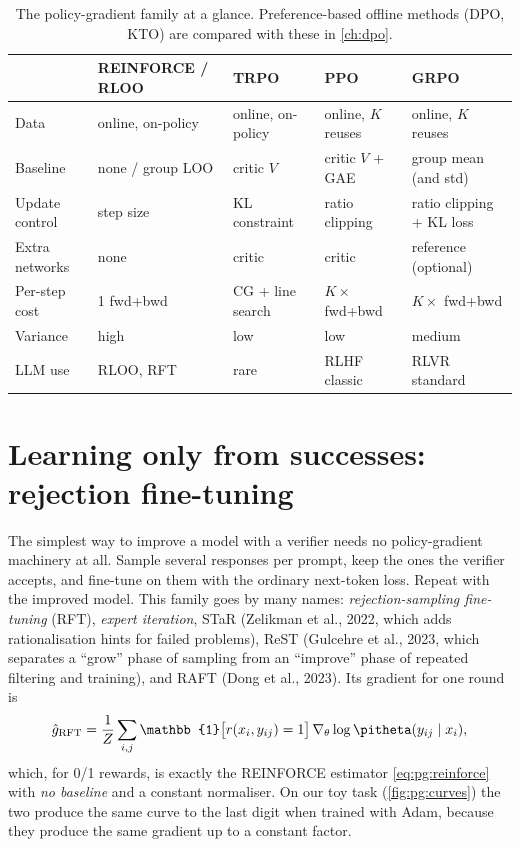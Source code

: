 \begin{table}[ht]
\centering\small
\begin{tabularx}{\linewidth}{@{}lXXXX@{}}
\toprule
& REINFORCE / RLOO & TRPO & PPO & GRPO\\
\midrule
Data & online, on-policy & online, on-policy & online, $K$ reuses & online, $K$ reuses\\
Baseline & none / group LOO & critic $V$ & critic $V$ + GAE & group mean (and std)\\
Update control & step size & KL constraint & ratio clipping & ratio clipping + KL loss\\
Extra networks & none & critic & critic & reference (optional)\\
Per-step cost & 1 fwd+bwd & CG + line search & $K\times$ fwd+bwd & $K\times$ fwd+bwd\\
Variance & high & low & low & medium\\
LLM use & RLOO, RFT & rare & RLHF classic & RLVR standard\\
\bottomrule
\end{tabularx}
\caption{The policy-gradient family at a glance. Preference-based offline methods (DPO, KTO)
are compared with these in \cref{ch:dpo}.}
\label{tab:pg:compare}
\end{table}
\section{Learning only from successes: rejection fine-tuning}\label{sec:pg:rft}

The simplest way to improve a model with a verifier needs no policy-gradient machinery at all.
Sample several responses per prompt, keep the ones the verifier accepts, and fine-tune on them
with the ordinary next-token loss. Repeat with the improved model. This family goes by many
names: \emph{rejection-sampling fine-tuning} (RFT), \emph{expert iteration}, STaR (Zelikman et
al., 2022, which adds rationalisation hints for failed problems), ReST (Gulcehre et al., 2023,
which separates a ``grow'' phase of sampling from an ``improve'' phase of repeated filtering and
training), and RAFT (Dong et al., 2023). Its gradient for one round is
\begin{equation}
\hat g_{\text{RFT}}=\frac{1}{Z}\sum_{i,j}\mathbb{1}\big[r(x_i,y_{ij})=1\big]\,\nabla_\theta\log\pitheta(y_{ij}\mid x_i),
\end{equation}
which, for 0/1 rewards, is exactly the REINFORCE estimator \cref{eq:pg:reinforce} with
\emph{no baseline} and a constant normaliser. On our toy task (\cref{fig:pg:curves}) the two
produce the same curve to the last digit when trained with Adam, because they produce the same
gradient up to a constant factor.

